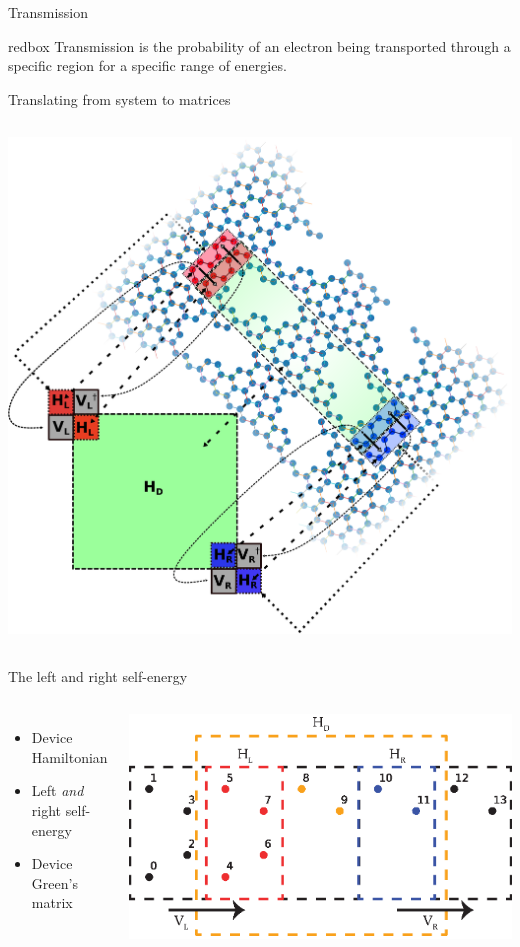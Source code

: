 \documentclass[hyperref={colorlinks=true,urlcolor=blue,linkcolor=.},aspectratio=1610,mathserif]{beamer}
\newcommand{\im}[3]{\inputminted[linenos=true, python3=true, firstline=#2, lastline=#3]{python}{#1}}
\begin{document}
\begin{frame}{Transmission}
	\centering
	\vspace{.05\textwidth}
	\begin{beamercolorbox}[sep=1em,wd=15cm]{redbox}
		Transmission is the probability of an electron being transported through a specific region for a specific range of energies.
	\end{beamercolorbox}
\end{frame}

\begin{frame}{Translating from system to matrices}
	\begin{columns}[c]
		\includegraphics[width=.64\textwidth]{Figures/illu.eps}
	\end{columns}
\end{frame}

\begin{frame}{The left and right self-energy}
	\begin{center}
		\begin{columns}[c]
			\begin{itemize}
                \item Device Hamiltonian 
                \item Left \textit{and} right self-energy
                \item Device Green's matrix
			\end{itemize}
			\includegraphics[width=.6\textwidth]{Figures/2DHam.eps}
		\end{columns}
	\end{center}
	\begin{columns}[t]\im{Listings/Functions.py}{210}{212}\end{columns}
\end{frame}
\end{document}
